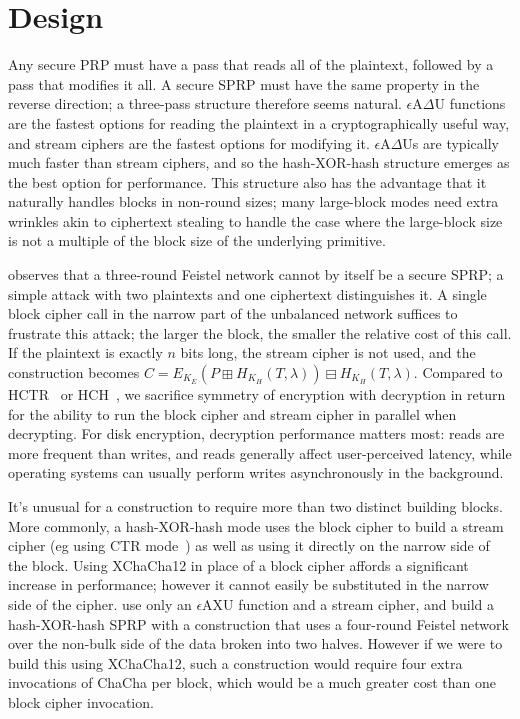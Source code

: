 \documentclass[journal=tosc,preprint,floatrow,submission]{iacrtrans}
\begin{document}
\section{Design}
Any secure PRP must have a pass that reads all of the plaintext, followed by a pass that modifies
it all. A secure SPRP must have the same property in the reverse direction;
a three-pass structure therefore seems natural.
$\epsilon$A$\Delta$U functions are the fastest options for reading the plaintext in a
cryptographically useful way, and stream ciphers are the fastest options for modifying it.
$\epsilon$A$\Delta$Us
are typically much faster than stream ciphers, and so the hash-XOR-hash structure emerges as
the best option for performance. This structure also has the advantage that it naturally handles
blocks in non-round sizes; many large-block modes need extra wrinkles akin to ciphertext stealing
to handle the case where the large-block size is not
a multiple of the block size of the underlying primitive.

\cite{luby-rackoff} observes that a three-round Feistel network cannot by itself be a secure SPRP;
a simple attack with two plaintexts and one ciphertext distinguishes it. A single block cipher call
in the narrow part of the unbalanced network suffices to frustrate this attack; the
larger the block, the smaller the relative cost of this call. If the plaintext is exactly $n$ bits
long, the stream cipher is not used, and the construction becomes
$C = E_{K_E}(P \boxplus H_{K_H}(T, \lambda)) \boxminus H_{K_H}(T, \lambda)$.
Compared to HCTR~\cite{hctr} or HCH~\cite{hch}, we sacrifice
symmetry of encryption with decryption in return for
the ability to run the block cipher and stream cipher in parallel when decrypting.
For disk encryption, decryption performance matters most:
reads are more frequent than writes, and reads generally affect user-perceived latency, while
operating systems can usually perform writes asynchronously in the background.

It's unusual for a construction to require more than two distinct building blocks.
More commonly, a hash-XOR-hash mode uses the block cipher to build a stream cipher
(eg using CTR mode~\cite{ctr})
as well as using it directly on the narrow side of the block.
Using XChaCha12 in place of a block cipher affords a significant increase in performance;
however it cannot easily be substituted in the narrow side of the cipher.
\cite{sarkar1,sarkar2,sarkar3,sarkar4} use only an $\epsilon$AXU function
and a stream cipher, and build a hash-XOR-hash SPRP
with a construction that uses a four-round Feistel network over the non-bulk side of the data
broken into two halves. However if we were to build this using XChaCha12,
such a construction would require four extra invocations of ChaCha per block, which would be
a much greater cost than one block cipher invocation.
\end{document}
